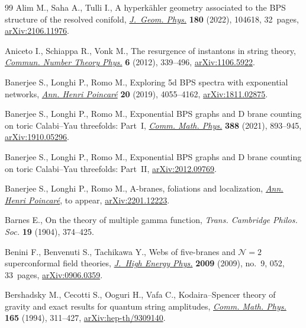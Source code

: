 \documentclass[pdftex]{sigma}
\numberwithin{equation}{section}
\begin{document}
\begin{thebibliography}{99}
Alim M., Saha A., Tulli I., A hyperk\"ahler geometry associated to the {BPS}
 structure of the resolved conifold, \href{https://doi.org/10.1016/j.geomphys.2022.104618}{\textit{J.~Geom. Phys.}} \textbf{180}
 (2022), 104618, 32~pages, \href{https://arxiv.org/abs/2106.11976}{arXiv:2106.11976}.

Aniceto I., Schiappa R., Vonk M., The resurgence of instantons in string
 theory, \href{https://doi.org/10.4310/CNTP.2012.v6.n2.a3}{\textit{Commun. Number Theory Phys.}} \textbf{6} (2012), 339--496,
 \href{https://arxiv.org/abs/1106.5922}{arXiv:1106.5922}.

Banerjee S., Longhi P., Romo M., Exploring 5d {BPS} spectra with exponential
 networks, \href{https://doi.org/10.1007/s00023-019-00851-x}{\textit{Ann. Henri Poincar\'e}} \textbf{20} (2019), 4055--4162,
 \href{https://arxiv.org/abs/1811.02875}{arXiv:1811.02875}.

Banerjee S., Longhi P., Romo M., Exponential {BPS} graphs and {D} brane
 counting on toric {C}alabi--{Y}au threefolds: {P}art~{I}, \href{https://doi.org/10.1007/s00220-021-04242-4}{\textit{Comm. Math.
 Phys.}} \textbf{388} (2021), 893--945, \href{https://arxiv.org/abs/1910.05296}{arXiv:1910.05296}.

Banerjee S., Longhi P., Romo M., Exponential {BPS} graphs and {D} brane
 counting on toric {C}alabi--{Y}au threefolds: {P}art~{II},
 \href{https://arxiv.org/abs/2012.09769}{arXiv:2012.09769}.

Banerjee S., Longhi P., Romo M., {A}-branes, foliations and localization,
 \href{https://doi.org/10.1007/s00023-022-01231-8}{\textit{Ann. Henri Poincar\'e}}, {t}o appear, \href{https://arxiv.org/abs/2201.12223}{arXiv:2201.12223}.

Barnes E., On the theory of multiple gamma function, \textit{Trans. Cambridge
 Philos. Soc.} \textbf{19} (1904), 374--425.

Benini F., Benvenuti S., Tachikawa Y., Webs of five-branes and {${\mathcal
 N}=2$} superconformal field theories, \href{https://doi.org/10.1088/1126-6708/2009/09/052}{\textit{J.~High Energy Phys.}}
 \textbf{2009} (2009), no.~9, 052, 33~pages, \href{https://arxiv.org/abs/0906.0359}{arXiv:0906.0359}.

Bershadsky M., Cecotti S., Ooguri H., Vafa C., Kodaira--{S}pencer theory of
 gravity and exact results for quantum string amplitudes, \href{https://doi.org/10.1007/BF02099774}{\textit{Comm. Math.
 Phys.}} \textbf{165} (1994), 311--427, \href{https://arxiv.org/abs/hep-th/9309140}{arXiv:hep-th/9309140}.


\end{thebibliography}
\end{document}
